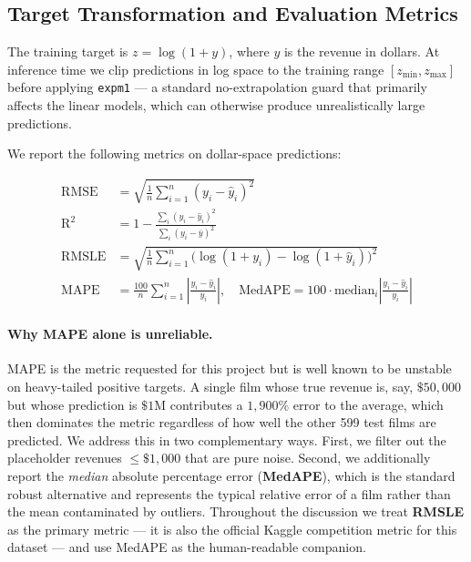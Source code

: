 \documentclass[10pt,a4paper]{article}
\begin{document}
\subsection{Target Transformation and Evaluation Metrics}

The training target is $z = \log(1{+}y)$, where $y$ is the revenue in dollars.
At inference time we clip predictions in log space to the training range
$[z_{\min}, z_{\max}]$ before applying \texttt{expm1} — a standard no-extrapolation
guard that primarily affects the linear models, which can otherwise produce
unrealistically large predictions.

We report the following metrics on dollar-space predictions:

\begin{align}
\mathrm{RMSE}  &= \sqrt{\tfrac{1}{n}\sum_{i=1}^{n}(y_i - \hat y_i)^{2}} \\
\mathrm{R}^{2} &= 1 - \frac{\sum_{i}(y_i - \hat y_i)^{2}}{\sum_{i}(y_i - \bar y)^{2}} \\
\mathrm{RMSLE} &= \sqrt{\tfrac{1}{n}\sum_{i=1}^{n}\bigl(\log(1{+}y_i) - \log(1{+}\hat y_i)\bigr)^{2}} \\
\mathrm{MAPE}  &= \tfrac{100}{n}\sum_{i=1}^{n}\left|\frac{y_i - \hat y_i}{y_i}\right|, \quad
\mathrm{MedAPE}  = 100 \cdot \mathrm{median}_{i}\left|\frac{y_i - \hat y_i}{y_i}\right|
\end{align}

\paragraph{Why MAPE alone is unreliable.}
MAPE is the metric requested for this project but is well known to be unstable
on heavy-tailed positive targets. A single film whose true revenue is, say,
$\$50{,}000$ but whose prediction is $\$1$M contributes a $1{,}900\%$ error to the
average, which then dominates the metric regardless of how well the other 599
test films are predicted. We address this in two complementary ways. First, we
filter out the placeholder revenues $\le \$1{,}000$ that are pure noise. Second,
we additionally report the \emph{median} absolute percentage error
(\textbf{MedAPE}), which is the standard robust alternative and represents the
typical relative error of a film rather than the mean contaminated by outliers.
Throughout the discussion we treat \textbf{RMSLE} as the primary metric — it is
also the official Kaggle competition metric for this dataset — and use MedAPE as
the human-readable companion.
\end{document}
